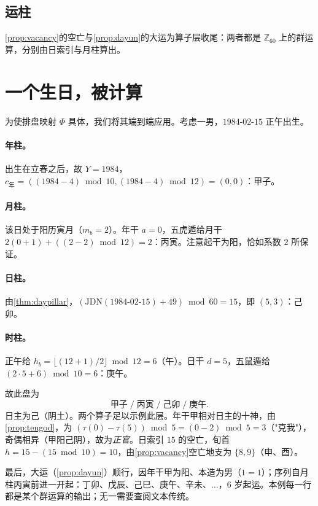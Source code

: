 \documentclass[11pt,a4paper,fontset=none]{ctexart}
\theoremstyle{definition}
\theoremstyle{remark}
\newcommand{\Z}{\mathbb{Z}}
\begin{document}
\subsection{运柱}
\cref{prop:vacancy}的空亡与\cref{prop:dayun}的大运为算子层收尾：两者都是 $\Z_{60}$ 上的群运算，分别由日索引与月柱算出。

\section{一个生日，被计算}\label{sec:example}
为使排盘映射 $\Phi$ 具体，我们将其端到端应用。考虑一男，$1984$-$02$-$15$ 正午出生。

\paragraph{年柱。} 出生在立春之后，故 $Y=1984$，$c_{\text{年}}=((1984-4)\bmod10,(1984-4)\bmod12)=(0,0)$：甲子。

\paragraph{月柱。} 该日处于阳历寅月（$m_b=2$）。年干 $a=0$，五虎遁给月干 $2(0+1)+((2-2)\bmod12)=2$：丙寅。注意起干为阳，恰如系数 $2$ 所保证。

\paragraph{日柱。} 由\cref{thm:daypillar}，$(\mathrm{JDN}(1984\text{-}02\text{-}15)+49)\bmod60=15$，即 $(5,3)$：己卯。

\paragraph{时柱。} 正午给 $h_b=\lfloor(12+1)/2\rfloor\bmod12=6$（午）。日干 $d=5$，五鼠遁给 $(2\cdot5+6)\bmod10=6$：庚午。

故此盘为
\[
\text{甲子}\;/\;\text{丙寅}\;/\;\text{己卯}\;/\;\text{庚午}.
\]
日主为己（阴土）。两个算子足以示例此层。年干甲相对日主的十神，由\cref{prop:tengod}，为 $(\tau(0)-\tau(5))\bmod5=(0-2)\bmod5=3$（"克我"），奇偶相异（甲阳己阴），故为\emph{正官}。日索引 $15$ 的空亡，旬首 $h=15-(15\bmod10)=10$，由\cref{prop:vacancy}空亡地支为 $\{8,9\}$（申、酉）。

最后，大运（\cref{prop:dayun}）顺行，因年干甲为阳、本造为男（$1=1$）；序列自月柱丙寅前进一开起：丁卯、戊辰、己巳、庚午、辛未、$\dots$，$6$ 岁起运。本例每一行都是某个群运算的输出；无一需要查阅文本传统。
\end{document}

